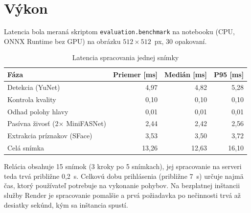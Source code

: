 
\section{Výkon}

Latencia bola meraná skriptom \texttt{evaluation.benchmark} na notebooku (CPU, ONNX
Runtime bez GPU) na obrázku $512\times512$~px, 30 opakovaní.

\begin{table}[H]
  \centering
  \caption{Latencia spracovania jednej snímky}
  \label{tab:latencia}
  \begin{tabular}{@{}lrrr@{}}
    \toprule
    Fáza & Priemer [ms] & Medián [ms] & P95 [ms] \\
    \midrule
    Detekcia (YuNet) & 4,97 & 4,82 & 5,28 \\
    Kontrola kvality & 0,10 & 0,10 & 0,10 \\
    Odhad polohy hlavy & 0,01 & 0,01 & 0,01 \\
    Pasívna živosť (2$\times$ MiniFASNet) & 2,44 & 2,42 & 2,56 \\
    Extrakcia príznakov (SFace) & 3,53 & 3,50 & 3,72 \\
    \midrule
    Celá snímka & 13,26 & 12,63 & 16,10 \\
    \bottomrule
  \end{tabular}
\end{table}

Relácia obsahuje 15 snímok (3 kroky po 5 snímkach), jej spracovanie na serveri teda
trvá približne 0,2~s. Celkovú dobu prihlásenia (približne 7~s) určuje najmä čas, ktorý
používateľ potrebuje na vykonanie pohybov. Na bezplatnej inštancii služby Render je
spracovanie pomalšie a prvá požiadavka po nečinnosti trvá až desiatky sekúnd, kým sa
inštancia spustí.
